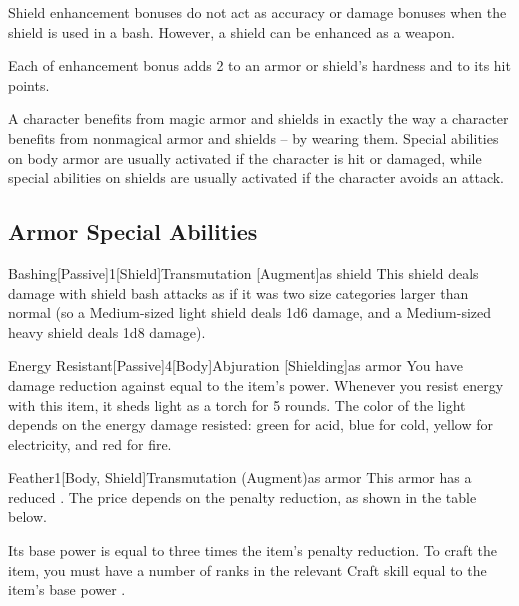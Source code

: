              Shield enhancement bonuses do not act as accuracy or damage bonuses when the shield is used in a bash.
            However, a shield can be enhanced as a weapon.

             Each  of enhancement bonus adds 2 to an armor or shield's hardness and  to its hit points.

             A character benefits from magic armor and shields in exactly the way a character benefits from nonmagical armor and shields -- by wearing them.
            Special abilities on body armor are usually activated if the character is hit or damaged, while special abilities on shields are usually activated if the character avoids an attack.

    \subsection{Armor Special Abilities}\label{Armor Special Abilities}

        \begin{magicitemdef}{Bashing}[Passive]{1}[Shield]{Transmutation [Augment]}{as shield}
             This shield deals damage with shield bash attacks as if it was two size categories larger than normal (so a Medium-sized light shield deals 1d6 damage, and a Medium-sized heavy shield deals 1d8 damage).
        \end{magicitemdef}

        \begin{magicitemdef}{Energy Resistant}[Passive]{4}[Body]{Abjuration [Shielding]}{as armor}
             You have damage reduction against  equal to the item's power.
            Whenever you resist energy with this item, it sheds light as a torch for 5 rounds.
            The color of the light depends on the energy damage resisted: green for acid, blue for cold, yellow for electricity, and red for fire.
        \end{magicitemdef}

        \begin{magicitemdef}{Feather}{1}[Body, Shield]{Transmutation (Augment)}{as armor}
             This armor has a reduced .
            The price depends on the penalty reduction, as shown in the table below.

            Its base power is equal to three times the item's penalty reduction.
            To craft the item, you must have a number of ranks in the relevant Craft skill equal to the item's base power .
        \end{magicitemdef}

